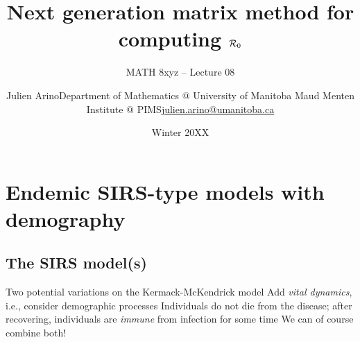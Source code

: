 \documentclass[aspectratio=169]{beamer}\usepackage[]{graphicx}\usepackage[]{xcolor}
\subtitle{MATH 8xyz -- Lecture 08}
\author{\texorpdfstring{Julien Arino\newline Department of Mathematics @ University of Manitoba \newline Maud Menten Institute @ PIMS\newline\url{julien.arino@umanitoba.ca}}{Julien Arino}}
\date{Winter 20XX}
\title{Next generation matrix method for computing $\mathcal{R}_0$}
\begin{document}


\section{Endemic SIRS-type models with demography}

\subsection{The SIRS model(s)}
\begin{frame}{Two potential variations on the Kermack-McKendrick model}
\bbullet Add \emph{vital dynamics}, i.e., consider demographic processes
\vfill
\bbullet Individuals do not die from the disease; after recovering, individuals are \emph{immune} from infection for some time
\vfill
\bbullet We can of course combine both!
\end{frame}
\end{document}
